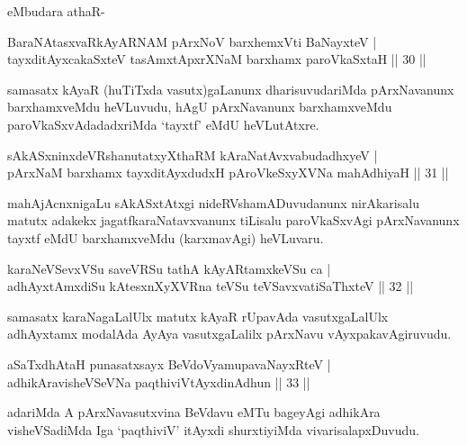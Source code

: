  eMbudara athaR-

\begin{shl}
BaraNAtasxvaRkAyARNAM pArxNoV barxhemxVti BaNayxteV |\\
tayxditAyxcakaSxteV tasAmxtApxrXNaM barxhamx paroVkaSxtaH \hfill || 30 ||
\end{shl}

\begin{artha}
samasatx kAyaR (huTiTxda vasutx)gaLanunx dharisuvudariMda pArxNavanunx barxhamxveMdu heVLuvudu, hAgU pArxNavanunx barxhamxveMdu paroVkaSxvAdadadxriMda `tayxtf' eMdU heVLutAtxre.
\end{artha}

\begin{shl}
sAkASxninxdeVRshanutatxyXthaRM kAraNatAvxvabudadhxyeV |\\
pArxNaM barxhamx tayxditAyxdudxH pAroVkeSxyXVNa mahAdhiyaH \hfill || 31 ||
\end{shl}

\begin{artha}
mahAjAcnxnigaLu sAkASxtAtxgi nideRVshamADuvudanunx nirAkarisalu matutx adakekx jagatfkaraNatavxvanunx tiLisalu paroVkaSxvAgi pArxNavanunx tayxtf eMdU barxhamxveMdu (karxmavAgi) heVLuvaru.
\end{artha}

\begin{shl}
karaNeVSevxVSu saveVRSu tathA kAyARtamxkeVSu ca |\\
adhAyxtAmxdiSu kAtesxnXyXVRna teVSu teVSavxvatiSaThxteV \hfill || 32 ||
\end{shl}

\begin{artha}
samasatx karaNagaLalUlx matutx kAyaR rUpavAda vasutxgaLalUlx adhAyxtamx modalAda AyAya vasutxgaLalilx pArxNavu vAyxpakavAgiruvudu.
\end{artha}


\begin{shl}
aSaTxdhA\s taH punasatxsayx BeVdoV\s yamupavaNayxRteV |\\
adhikAravisheVSeVNa paqthiviVtAyxdinA\s dhun \hfill || 33 ||
\end{shl}

\begin{artha}
adariMda A pArxNavasutxvina BeVdavu eMTu bageyAgi adhikAra visheVSadiMda Iga `paqthiviV' itAyxdi shurxtiyiMda vivarisalapxDuvudu.
\end{artha}


